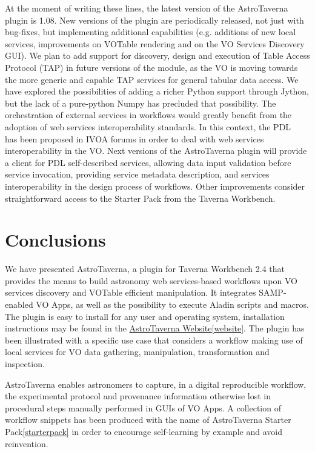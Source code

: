\documentclass{aa}
\begin{document}
At the moment of writing these lines, the latest version of the AstroTaverna plugin is 1.08. New versions of the plugin are periodically released, not just with bug-fixes, but implementing additional capabilities (e.g. additions of new local services, improvements on VOTable rendering and on the VO Services Discovery GUI). We plan to add support for discovery, design and execution of Table Access Protocol (TAP) in future versions of the module, as the VO is moving towards the more generic and capable TAP services for general tabular data access. We have explored the possibilities of adding a richer Python support through Jython, but the lack of a pure-python Numpy has precluded that possibility. The orchestration of external services in workflows would greatly benefit from the adoption of web services interoperability standards. In this context, the PDL~\citep[Parameter Description Language;][]{Zwolf2013} has been proposed in IVOA forums in order to deal with web services interoperability in the VO. Next versions of the AstroTaverna plugin will provide a client for PDL self-described services, allowing data input validation before service invocation, providing service metadata description, and services interoperability in the design process of workflows. Other improvements consider  straightforward access to the Starter Pack from the Taverna Workbench. 

\section{Conclusions}
\label{Conclusions}

We have presented AstroTaverna, a plugin for Taverna Workbench 2.4 that provides the means to build astronomy web services-based workflows upon VO services discovery and VOTable efficient manipulation. It integrates SAMP-enabled VO Apps, as well as the possibility to execute Aladin scripts and macros. The plugin is easy to install for any user and operating system, installation instructions may be found in the \href{http://wf4ever.github.io/astrotaverna/}{AstroTaverna Website}\cref{website}. The plugin has been illustrated with a specific use case that considers a workflow making use of local services for VO data gathering, manipulation, transformation and inspection.

AstroTaverna  enables astronomers to capture, in a digital reproducible workflow, the experimental protocol and provenance information otherwise lost in procedural steps manually performed in GUIs of VO Apps. A collection of workflow snippets has been produced with the name of AstroTaverna Starter Pack\cref{starterpack} in order to encourage self-learning by example and avoid reinvention.
\end{document}
